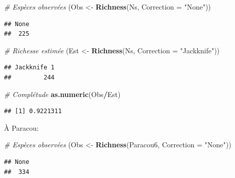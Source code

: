 \documentclass[
  11pt,
  french,
  a4paper,
  extrafontsizes,onecolumn,openright
  ]{memoir}
\newenvironment{Shaded}{\begin{snugshade}}{\end{snugshade}}
\newcommand{\AttributeTok}[1]{\textcolor[rgb]{0.13,0.29,0.53}{#1}}
\newcommand{\CommentTok}[1]{\textcolor[rgb]{0.56,0.35,0.01}{\textit{#1}}}
\newcommand{\FunctionTok}[1]{\textcolor[rgb]{0.13,0.29,0.53}{\textbf{#1}}}
\newcommand{\NormalTok}[1]{#1}
\newcommand{\OtherTok}[1]{\textcolor[rgb]{0.56,0.35,0.01}{#1}}
\newcommand{\SpecialCharTok}[1]{\textcolor[rgb]{0.81,0.36,0.00}{\textbf{#1}}}
\newcommand{\StringTok}[1]{\textcolor[rgb]{0.31,0.60,0.02}{#1}}
\begin{document}
\scriptsize

\begin{Shaded}
\begin{Highlighting}[]
\CommentTok{\# Espèces observées}
\NormalTok{(Obs }\OtherTok{\textless{}{-}} \FunctionTok{Richness}\NormalTok{(Ns, }\AttributeTok{Correction =} \StringTok{"None"}\NormalTok{))}
\end{Highlighting}
\end{Shaded}

\begin{verbatim}
## None 
##  225
\end{verbatim}

\begin{Shaded}
\begin{Highlighting}[]
\CommentTok{\# Richesse estimée}
\NormalTok{(Est }\OtherTok{\textless{}{-}} \FunctionTok{Richness}\NormalTok{(Ns, }\AttributeTok{Correction =} \StringTok{"Jackknife"}\NormalTok{))}
\end{Highlighting}
\end{Shaded}

\begin{verbatim}
## Jackknife 1 
##         244
\end{verbatim}

\begin{Shaded}
\begin{Highlighting}[]
\CommentTok{\# Complétude}
\FunctionTok{as.numeric}\NormalTok{(Obs}\SpecialCharTok{/}\NormalTok{Est)}
\end{Highlighting}
\end{Shaded}

\begin{verbatim}
## [1] 0.9221311
\end{verbatim}

\normalsize

À Paracou:

\scriptsize

\begin{Shaded}
\begin{Highlighting}[]
\CommentTok{\# Espèces observées}
\NormalTok{(Obs }\OtherTok{\textless{}{-}} \FunctionTok{Richness}\NormalTok{(Paracou6, }\AttributeTok{Correction =} \StringTok{"None"}\NormalTok{))}
\end{Highlighting}
\end{Shaded}

\begin{verbatim}
## None 
##  334
\end{verbatim}
\end{document}
